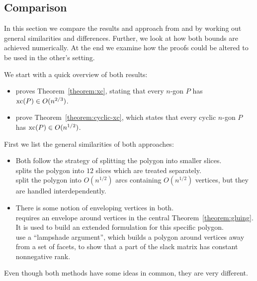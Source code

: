 \subsection{Comparison}

In this section we compare the results and approach from \textcite{shitov2020sublinear} and \textcite{kwan2020extension} by working out general similarities and differences. Further, we look at how both bounds are achieved numerically. At the end we examine how the proofs could be altered to be used in the other's setting.

We start with a quick overview of both results:

\begin{itemize}
  \item \textcite{shitov2020sublinear} proves Theorem~\ref{theorem:xc}, stating that every $n$-gon $P$ has $\operatorname{xc}(P) \in O(n^{2/3})$.
  \item \textcite{kwan2020extension} prove Theorem~\ref{theorem:cyclic-xc}, which states that every cyclic $n$-gon $P$ has $\operatorname{xc}(P) \in O(n^{1/2})$.
\end{itemize}

First we list the general similarities of both approaches:

\begin{itemize}
  \item Both follow the strategy of splitting the polygon into smaller slices.\\
        \textcite{shitov2020sublinear} splits the polygon into $12$ slices which are treated separately.\\
        \textcite{kwan2020extension} split the polygon into $O(n^{1/2})$ arcs containing $O(n^{1/2})$ vertices, but they are handled interdependently.
  \item There is some notion of enveloping vertices in both.\\
        \textcite{shitov2020sublinear} requires an envelope around vertices in the central Theorem~\ref{theorem:gluing}. It is used to build an extended formulation for this specific polygon.\\
        \textcite{kwan2020extension} use a ``lampshade argument'', which builds a polygon around vertices away from a set of facets, to show that a part of the slack matrix has constant nonnegative rank.
\end{itemize}

Even though both methods have some ideas in common, they are very different.

